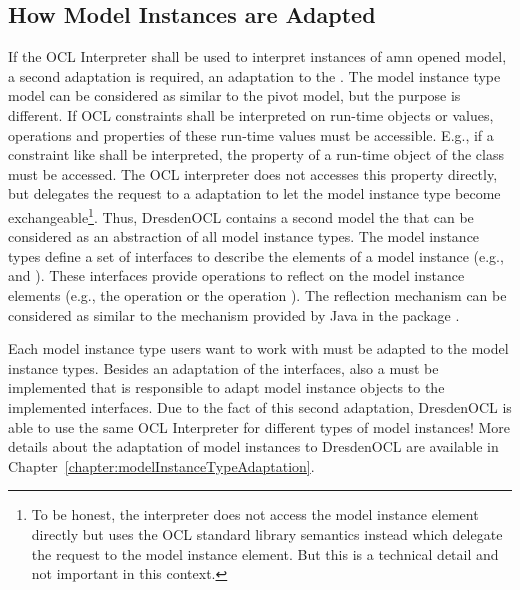 \subsection{How Model Instances are Adapted}
\label{architecture:modelInstanceAdaptation}

If the \acs{OCL} Interpreter shall be used to interpret instances of amn opened 
model, a second adaptation is required, an adaptation to the . The model instance type model can be considered as similar
to the pivot model, but the purpose is different. If \acs{OCL} constraints shall
be interpreted on run-time objects or values, operations and properties of these
run-time values must be accessible. E.g., if a constraint like  shall be interpreted, the property  of a
run-time object of the class  must be accessed. The \acs{OCL} 
interpreter does not accesses this property directly, but delegates the request 
to a  adaptation to let the model instance type
become exchangeable\footnote{To be honest, the interpreter does not access the
model instance element directly but uses the \acs{OCL} standard library
semantics instead which delegate the request to the model instance element. But
this is a technical detail and not important in this context.}. Thus,
DresdenOCL contains a second model the 
that can be considered as an abstraction of all model instance types. The model 
instance types define a set of interfaces to describe the elements of a model 
instance (e.g.,  and 
). These interfaces provide operations to reflect on 
the model instance elements (e.g., the operation
 or the operation 
). The reflection mechanism can be 
considered as similar to the mechanism provided by Java in the package 
.

Each model instance type users want to work with must be adapted to the model 
instance types. Besides an adaptation of the interfaces, also a 
 must be implemented that is responsible to adapt 
model instance objects to the implemented interfaces. Due to the fact of this 
second adaptation, DresdenOCL is able to use the same \acs{OCL} Interpreter for
different types of model instances! More details about the adaptation of model 
instances to DresdenOCL are available in 
Chapter~\ref{chapter:modelInstanceTypeAdaptation}.


